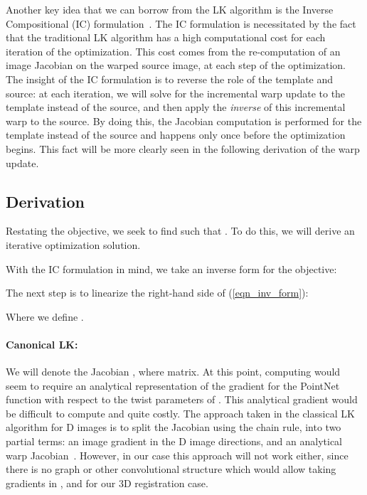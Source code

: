\documentclass[10pt,twocolumn,letterpaper]{article}
\begin{document}
Another key idea that we can borrow from the LK algorithm is the Inverse Compositional (IC) formulation~\cite{baker2004lucas}. The IC formulation is necessitated by the fact that the traditional LK algorithm has a high computational cost for each iteration of the optimization. This cost comes from the re-computation of an image Jacobian on the warped source image, at each step of the optimization. The insight of the IC formulation is to reverse the role of the template and source: at each iteration, we will solve for the incremental warp update to the template instead of the source, and then apply the \emph{inverse} of this incremental warp to the source. By doing this, the Jacobian computation is performed for the template instead of the source and happens only once before the optimization begins. This fact will be more clearly seen in the following derivation of the warp update.

\subsection{Derivation} \label{method_derivation}
Restating the objective, we seek to find  such that . To do this, we will derive an iterative optimization solution. 

With the IC formulation in mind, we take an inverse form for the objective:



The next step is to linearize the right-hand side of (\ref{eqn_inv_form}):



Where we define .

\paragraph{Canonical LK:} 

We will denote the Jacobian \mbox{}, where  matrix. At this point, computing  would seem to require an analytical representation of the gradient for the PointNet function with respect to the twist parameters of . This analytical gradient would be difficult to compute and quite costly. The approach taken in the classical LK algorithm for D images is to split the Jacobian using the chain rule, into two partial terms: an image gradient in the D image directions, and an analytical warp Jacobian~\cite{baker2004lucas}. However, in our case this approach will not work either, since there is no graph or other convolutional structure which would allow taking gradients in ,  and  for our 3D registration case.
\end{document}
